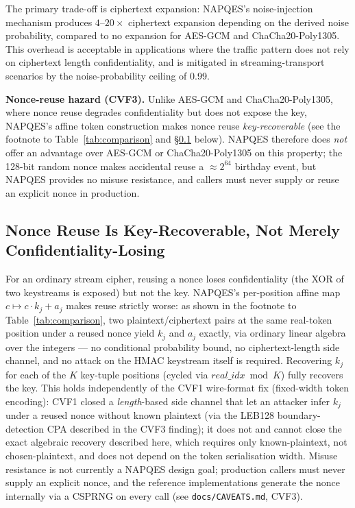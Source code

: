 \documentclass[11pt,a4paper]{article}
\begin{document}
The primary trade-off is ciphertext expansion: NAPQES's noise-injection
mechanism produces $4\text{--}20\times$ ciphertext expansion depending on the
derived noise probability, compared to no expansion for AES-GCM and
ChaCha20-Poly1305.  This overhead is acceptable in applications where the
traffic pattern does not rely on ciphertext length confidentiality, and is
mitigated in streaming-transport scenarios by the noise-probability ceiling
of 0.99.

\textbf{Nonce-reuse hazard (CVF3).}  Unlike AES-GCM and ChaCha20-Poly1305,
where nonce reuse degrades confidentiality but does not expose the key,
NAPQES's affine token construction makes nonce reuse \emph{key-recoverable}
(see the footnote to Table~\ref{tab:comparison} and \S\ref{sec:nonce-misuse}
below).  NAPQES therefore does \emph{not} offer an advantage over AES-GCM or
ChaCha20-Poly1305 on this property; the 128-bit random nonce makes
accidental reuse a $\approx 2^{64}$ birthday event, but NAPQES provides no
misuse resistance, and callers must never supply or reuse an explicit
nonce in production.

\subsection{Nonce Reuse Is Key-Recoverable, Not Merely Confidentiality-Losing}
\label{sec:nonce-misuse}

For an ordinary stream cipher, reusing a nonce loses confidentiality (the
XOR of two keystreams is exposed) but not the key.  NAPQES's per-position
affine map $c \mapsto c\cdot k_j + a_j$ makes reuse strictly worse: as shown
in the footnote to Table~\ref{tab:comparison}, two plaintext/ciphertext
pairs at the same real-token position under a reused nonce yield $k_j$ and
$a_j$ exactly, via ordinary linear algebra over the integers — no
conditional probability bound, no ciphertext-length side channel, and no
attack on the HMAC keystream itself is required.  Recovering $k_j$ for each
of the $K$ key-tuple positions (cycled via $\mathit{real\_idx} \bmod K$)
fully recovers the key.  This holds independently of the CVF1 wire-format
fix (fixed-width token encoding): CVF1 closed a \emph{length}-based side
channel that let an attacker infer $k_j$ under a reused nonce without known
plaintext (via the LEB128 boundary-detection CPA described in the CVF3
finding); it does not and cannot close the exact algebraic recovery
described here, which requires only known-plaintext, not chosen-plaintext,
and does not depend on the token serialisation width. Misuse resistance is
not currently a NAPQES design goal; production callers must never supply
an explicit nonce, and the reference implementations generate the nonce
internally via a CSPRNG on every call (see \texttt{docs/CAVEATS.md}, CVF3).
\end{document}
